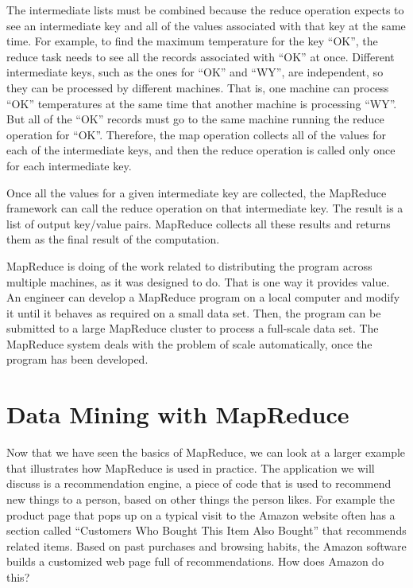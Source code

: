 The intermediate lists must be combined because
the reduce operation expects to see an intermediate key and all
of the values associated with that key at the same time. For example,
to find the maximum temperature for the key ``OK'', the reduce
task needs to see all the records associated with ``OK'' at once.
Different intermediate keys, such as the ones for ``OK'' and ``WY'',
are independent, so they can be processed by different machines.
That is, one machine can process ``OK'' temperatures at the same
time that another machine is processing ``WY''.
But all of the ``OK'' records must go to the same machine running
the reduce operation for ``OK''.
Therefore, the map operation collects all of the values for
each of the intermediate keys, and then the reduce operation is
called only once for each intermediate key.

Once all the values for a given intermediate key are
collected, the MapReduce framework can call the reduce
operation on that intermediate key.  The result is a list of
output key/value pairs. MapReduce collects all these
results and returns them as the final result of the computation.

MapReduce is doing of the work
related to distributing the program across multiple machines,
as it was designed to do.
That is one way it provides value.
An engineer can develop a MapReduce program on
a local computer and modify it until it behaves as
required on a small data set.
Then, the program can be submitted to a large MapReduce cluster
to process a full-scale data set.
The MapReduce system deals with the problem of scale
automatically, once the program has been developed.

\section{Data Mining with MapReduce}

Now that we have seen the basics of MapReduce, we can look at
a larger example that illustrates how MapReduce is
used in practice.  The application we will discuss is a recommendation engine,
a piece of code that is used to recommend new things to a person,
based on other things the person likes.
For example the product page that pops up on a typical visit to
the Amazon website often has a section called ``Customers Who Bought
This Item Also Bought'' that recommends related items.
Based on past purchases and browsing habits, the Amazon software
builds a customized web page full of recommendations.
How does Amazon do this?

